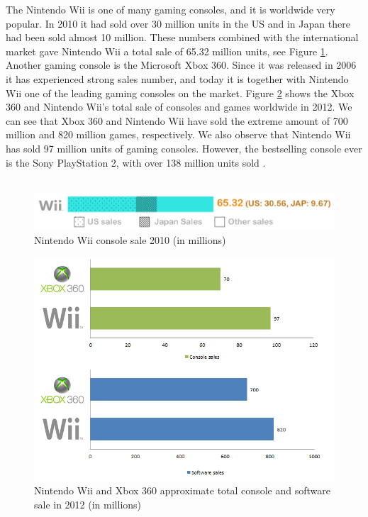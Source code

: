 The Nintendo Wii is one of many gaming consoles, and it is worldwide very popular. In 2010 it had sold over 30 million units in the US and in Japan there had been sold almost 10 million. These numbers combined with the international market gave Nintendo Wii a total sale of 65.32 million units, see Figure \ref{fig:ConsoleWarWii}. Another gaming console is the Microsoft Xbox 360. Since it was released in 2006 it has experienced strong sales number, and today it is together with Nintendo Wii one of the leading gaming consoles on the market. Figure \ref{fig:XboxWiiSales} shows the Xbox 360 and Nintendo Wii's total sale of consoles and games worldwide in 2012. We can see that Xbox 360 and Nintendo Wii have sold the extreme amount of 700 million and 820 million games, respectively. We also observe that Nintendo Wii has sold 97 million units of gaming consoles. However, the bestselling console ever is the Sony PlayStation 2, with over 138 million units sold \cite{statistics2012}. \\ \\

\begin{figure}[h!]
\begin{center}
\includegraphics[scale=0.5]{consolewarwii}
\caption[Nintendo Wii console sale]{Nintendo Wii console sale 2010 (in millions) \cite{statistics2012}}
\label{fig:ConsoleWarWii}
\end{center}
\end{figure}

\begin{figure}[h!]
\begin{center}
\includegraphics[scale=0.7]{xboxwiisales}
\caption[Nintendo Wii and Xbox 360 sales]{Nintendo Wii and Xbox 360 approximate total console and software sale in 2012 (in millions)\cite{nintendolife} \cite{microsoftxbox} \cite{vgchartzxbox} \cite{vgchartzwii} \cite{vgchartzhardware}}
\label{fig:XboxWiiSales}
\end{center}
\end{figure}

